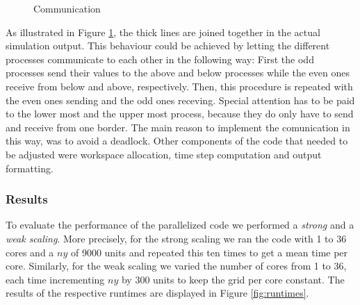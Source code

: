 \documentclass[12pt, a4paper, titlepage]{article}
\begin{document}
{\begin{figure}[h!]
\begin{minipage}{0.28\linewidth}
{
		}
		\caption{Communication}
		\label{fig:tikz}
		\end{minipage}
\end{figure}

As illustrated in Figure \ref{fig:tikz}, the thick lines are joined together in the actual simulation output. This behaviour could be achieved by letting the different processes communicate to each other in the following way: First the odd processes send their values to the above and below processes while the even ones receive from below and above, respectively. Then, this procedure is repeated with the even ones sending and the odd ones receving. Special attention has to be paid to the lower most and the upper most process, because they do only have to send and receive from one border. The main reason to implement the comunication in this way, was to avoid a deadlock.
Other components of the code that needed to be adjusted were workspace allocation, time step computation and output formatting.




\subsubsection{Results}
To evaluate the performance of the parallelized code we performed a \textit{strong} and a \textit{weak scaling}. More precisely, for the strong scaling we ran the code with 1 to 36 cores and a $ny$ of 9000 units and repeated this ten times to get a mean time per core. Similarly, for the weak scaling we varied the number of cores from 1 to 36, each time incrementing $ny$ by 300 units to keep the grid per core constant. The results of the respective runtimes are displayed in Figure \ref{fig:runtimes}.

}
\end{document}

